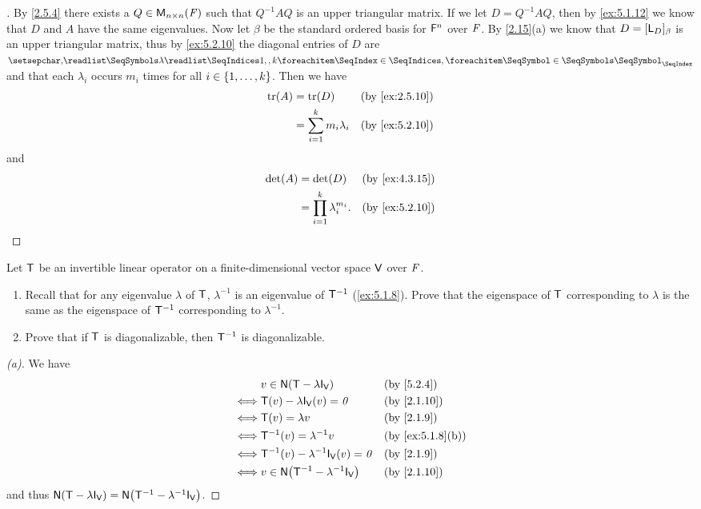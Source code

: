 \begin{proof}[]
  By \cref{2.5.4} there exists a \(Q \in \mathsf{M}_{{n} \times n}({\mathit{F}})\) such that \(Q^{-1} A Q\) is an upper triangular matrix.
  If we let \(D = Q^{-1} A Q\), then by \cref{ex:5.1.12} we know that \(D\) and \(A\) have the same eigenvalues.
  Now let \(\beta\) be the standard ordered basis for \(\mathsf{F}^n\) over \(\mathit{F}\).
  By \cref{2.15}(a) we know that \(D = [\mathsf{L}_D]_{\beta}\) is an upper triangular matrix, thus by \cref{ex:5.2.10} the diagonal entries of \(D\) are \(\seq{\lambda}{1,,k}\) and that each \(\lambda_i\) occurs \(m_i\) times for all \(i \in \left\lbrace1, \dots, k\right\rbrace\).
  Then we have
  \begin{align*}
    \tr(A) & = \tr(D)                       &  & \text{(by \cref{ex:2.5.10})} \\
           & = \sum_{i = 1}^k m_i \lambda_i &  & \text{(by \cref{ex:5.2.10})}
  \end{align*}
  and
  \begin{align*}
    \det(A) & = \det(D)                          &  & \text{(by \cref{ex:4.3.15})} \\
            & = \prod_{i = 1}^k \lambda_i^{m_i}. &  & \text{(by \cref{ex:5.2.10})}
  \end{align*}
\end{proof}

\begin{ex}\label{ex:5.2.12}
  Let \(\mathsf{T}\) be an invertible linear operator on a finite-dimensional vector space \(\mathsf{V}\) over \(\mathit{F}\).
  \begin{enumerate}
    \item Recall that for any eigenvalue \(\lambda\) of \(\mathsf{T}\), \(\lambda^{-1}\) is an eigenvalue of \(\mathsf{T}^{-1}\) (\cref{ex:5.1.8}).
          Prove that the eigenspace of \(\mathsf{T}\) corresponding to \(\lambda\) is the same as the eigenspace of \(\mathsf{T}^{-1}\) corresponding to \(\lambda^{-1}\).
    \item Prove that if \(\mathsf{T}\) is diagonalizable, then \(\mathsf{T}^{-1}\) is diagonalizable.
  \end{enumerate}
\end{ex}

\begin{proof}[(a)]
  We have
  \begin{align*}
         & v \in \ns{\T - \lambda \IT[\V]}            &  & \text{(by \cref{5.2.4})}       \\
    \iff & \T(v) - \lambda \IT[\V](v) = \zv           &  & \text{(by \cref{2.1.10})}      \\
    \iff & \T(v) = \lambda v                          &  & \text{(by \cref{2.1.9})}       \\
    \iff & \T^{-1}(v) = \lambda^{-1} v                &  & \text{(by \cref{ex:5.1.8}(b))} \\
    \iff & \T^{-1}(v) - \lambda^{-1} \IT[\V](v) = \zv &  & \text{(by \cref{2.1.9})}       \\
    \iff & v \in \ns{\T^{-1} - \lambda^{-1} \IT[\V]}  &  & \text{(by \cref{2.1.10})}
  \end{align*}
  and thus \(\ns{\T - \lambda \IT[\V]} = \ns{\T^{-1} - \lambda^{-1} \IT[\V]}\).
\end{proof}

